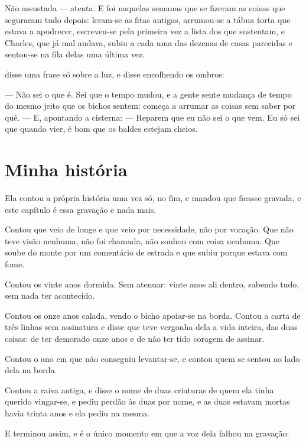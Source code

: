 \documentclass[livro.tex]{subfiles}
\begin{document}
Não assustada --- atenta. E foi naquelas semanas que se fizeram as coisas que seguraram tudo
depois: leram-se as fitas antigas, arrumou-se a tábua torta que estava a apodrecer, escreveu-se
pela primeira vez a lista dos que sustentam, e Charles, que já mal andava, subiu a cada uma das
dezenas de casas parecidas e sentou-se na fila delas uma última vez.

\medskip

\Lua disse uma frase só sobre a luz, e disse encolhendo os ombros:

--- Não sei o que é. Sei que o tempo mudou, e a gente sente mudança de tempo do mesmo jeito que
os bichos sentem: começa a arrumar as coisas sem saber por quê. --- E, apontando a cisterna: ---
Reparem que eu não sei o que vem. Eu só sei que quando vier, é bom que os baldes estejam cheios.

\chapter{Minha história}

Ela contou a própria história uma vez só, no fim, e mandou que ficasse gravada, e este capítulo é
essa gravação e nada mais.

\medskip

Contou que veio de longe e que veio por necessidade, não por vocação. Que não teve visão nenhuma,
não foi chamada, não sonhou com coisa nenhuma. Que soube do monte por um comentário de estrada e
que subiu porque estava com fome.

Contou os vinte anos dormida. Sem atenuar: vinte anos ali dentro, sabendo tudo, sem nada ter
acontecido.

Contou os onze anos calada, vendo o bicho apoiar-se na borda. Contou a carta de três linhas sem
assinatura e disse que teve vergonha dela a vida inteira, das duas coisas: de ter demorado onze
anos e de não ter tido coragem de assinar.

Contou o ano em que não conseguiu levantar-se, e contou quem se sentou ao lado dela na borda.

Contou a raiva antiga, e disse o nome de duas criaturas de quem ela tinha querido vingar-se, e
pediu perdão às duas por nome, e as duas estavam mortas havia trinta anos e ela pediu na mesma.

\medskip

E terminou assim, e é o único momento em que a voz dela falhou na gravação:
\end{document}
